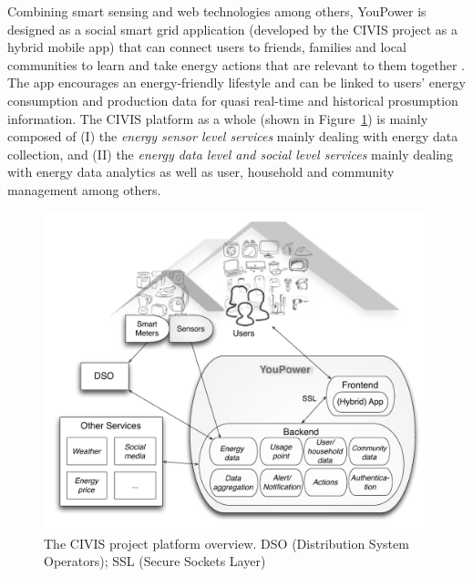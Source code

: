 
Combining smart sensing and web technologies among others,
YouPower is designed as a social smart grid application (developed by the CIVIS project as a hybrid mobile app) that can connect users to friends, families and local communities to learn and take energy actions that are relevant to them together \cite{Huang2017,Huang2015}. The app encourages an energy-friendly lifestyle and can be linked to users' energy consumption and production data for quasi real-time and historical prosumption information. 
% 
%
The CIVIS platform as a whole (shown in Figure~\ref{fig:platform}) is mainly composed of (I) the \textit{energy sensor level services} mainly
dealing with energy data collection, and (II) the \textit{energy data level and social
level services} mainly dealing with energy data analytics as well as user, household and community management
among others. 

\begin{figure}[h!]
\sidecaption[t]
	\includegraphics[width=.64\linewidth]{img/civis_platform_overview.pdf} %
	\caption{The CIVIS project platform overview. DSO (Distribution System Operators); SSL (Secure Sockets Layer)}\label{fig:platform}
\end{figure}


